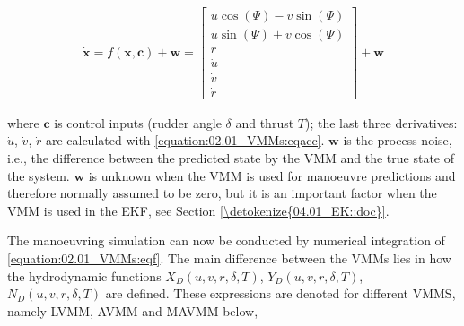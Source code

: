 \documentclass[review]{elsarticle}
\begin{document}
\begin{equation}\label{equation:02.01_VMMs:eqf}
\begin{split}\displaystyle \dot{\mathbf{x}} = f(\mathbf{x},\mathbf{c}) + \mathbf{w} = \left[\begin{matrix}u \cos{\left(\Psi \right)} - v \sin{\left(\Psi \right)}\\u \sin{\left(\Psi \right)} + v \cos{\left(\Psi \right)}\\r\\\dot{u}\\\dot{v}\\\dot{r}\end{matrix}\right] + \mathbf{w}\end{split}
\end{equation}

where \(\mathbf{c}\) is control inputs (rudder angle \(\delta\) and thrust $T$); the last three derivatives: \(\dot{u}\), \(\dot{v}\), \(\dot{r}\) are calculated with \autoref{equation:02.01_VMMs:eqacc}. \(\mathbf{w}\) is the  process noise, i.e., the difference between the predicted state by the VMM and the true state of the system. \(\mathbf{w}\) is unknown when the VMM is used for manoeuvre predictions and therefore normally assumed to be zero, but it is an important factor when the VMM is used in the EKF, see Section \ref{\detokenize{04.01_EK::doc}}.


\sphinxAtStartPar
The manoeuvring simulation can now be conducted by numerical integration of \autoref{equation:02.01_VMMs:eqf}. The main difference between the VMMs lies in how the hydrodynamic functions \(X_D(u,v,r,\delta,T)\), \(Y_D(u,v,r,\delta,T)\), \(N_D(u,v,r,\delta,T)\) are defined. These expressions are denoted for different VMMS, namely LVMM, AVMM and MAVMM below,
\end{document}
